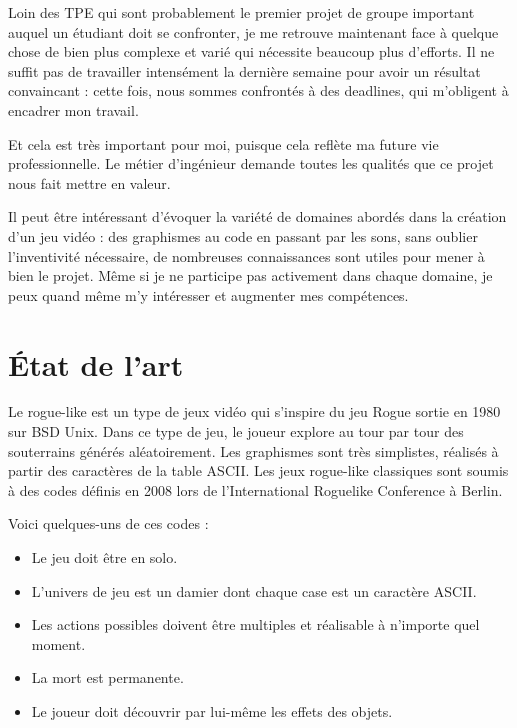 \documentclass[]{extarticle}
\begin{document}
	Loin des TPE qui sont probablement le premier projet de groupe important auquel un étudiant doit se confronter, je me retrouve maintenant face à quelque chose de bien plus complexe et varié qui nécessite beaucoup plus d'efforts. Il ne suffit pas de travailler intensément la dernière semaine pour avoir un résultat convaincant : cette fois, nous sommes confrontés à des deadlines, qui m'obligent à encadrer mon travail.
	
	Et cela est très important pour moi, puisque cela reflète ma future vie professionnelle. Le métier d'ingénieur demande toutes les qualités que ce projet nous fait mettre en valeur.
	
	Il peut être intéressant d'évoquer la variété de domaines abordés dans la création d'un jeu vidéo : des graphismes au code en passant par les sons, sans oublier l'inventivité nécessaire, de nombreuses connaissances sont utiles pour mener à bien le projet. Même si je ne participe pas activement dans chaque domaine, je peux quand même m'y intéresser et augmenter mes compétences.
	
\newpage
\section{État de l'art}
\bigbreak
\bigbreak
Le rogue-like est un type de jeux vidéo qui s’inspire du jeu Rogue sortie en 1980 sur BSD Unix. Dans ce type de jeu, le joueur explore au tour par tour des souterrains générés aléatoirement. Les graphismes sont très simplistes, réalisés à partir des caractères de la table ASCII. Les jeux rogue-like classiques sont soumis à des codes définis en 2008 lors de \og l’International Roguelike Conference \fg{} à Berlin. 

Voici quelques-uns de ces codes :    	
\begin{itemize}
\item Le jeu doit être en solo.
\item L’univers de jeu est un damier dont chaque case est un caractère ASCII.
\item Les actions possibles doivent être multiples et réalisable à n’importe quel moment.
\item La mort est permanente.
\item Le joueur doit découvrir par lui-même les effets des objets.
\end{itemize}
\end{document}
